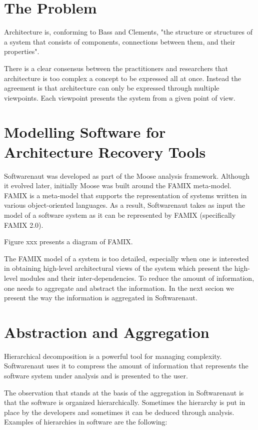 \documentclass[preprint,12pt]{elsarticle}
\begin{document}
\section {The Problem}

Architecture is, conforming to Bass and Clements, "the structure or 
structures of a system that consists of components, connections between
them, and their properties". 

There is a clear consensus between the practitioners and researchers that
architecture is too complex a concept to be expressed all at once. Instead
the agreement is that architecture can only be expressed through multiple 
viewpoints. Each viewpoint presents the system from a given point of view.


\section {Modelling Software for Architecture Recovery Tools}

Softwarenaut was developed as part of the Moose analysis framework. Although
it evolved later, initially Moose was built around the FAMIX meta-model. FAMIX is 
a meta-model that supports the representation of systems written in various 
object-oriented languages. As a result, Softwarenaut takes as input the model
of a software system as it can be represented by FAMIX (specifically FAMIX 2.0). 

Figure xxx presents a diagram of FAMIX. 

The FAMIX model of a system is too detailed, especially when one is interested
in obtaining high-level architectural views of the system which present the 
high-level modules and their inter-dependencies. To reduce the amount
of information, one needs to aggregate and abstract the information. In the next
secion we present the way the information is aggregated in Softwarenaut. 

\section {Abstraction and Aggregation}

Hierarchical decomposition is a powerful tool for managing complexity. Softwarenaut
uses it to compress the amount of information that represents the software 
system under analysis and is presented to the user. 

The observation that stands at the basis of the aggregation in Softwarenaut is that
the software is organized hierarchically. Sometimes the hierarchy is put in place 
by the developers and sometimes it can be deduced through analysis. Examples of 
hierarchies in software are the following: 
\end{document}
